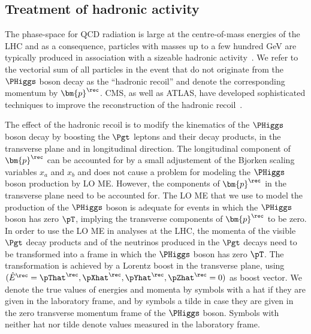 \subsection{Treatment of hadronic activity}
\label{sec:mem_hadRecoil}

The phase-space for QCD radiation is large at the centre-of-mass
energies of the LHC
and as a consequence, particles with masses up to a few hundred GeV 
are typically produced in association with a sizeable hadronic activity~\cite{Alwall:2010cq}.
We refer to the vectorial sum of all particles in the event that do not originate from the $\PHiggs$ boson decay
as the ``hadronic recoil'' and denote the corresponding momentum by $\bm{p}^{\rec}$.
CMS, as well as ATLAS, have developed sophisticated techniques to improve the reconstruction 
of the hadronic recoil~\cite{CMS-JME-13-003,ATLAS-CONF-2014-019}.

The effect of the hadronic recoil is to modify the kinematics of the $\PHiggs$ boson decay
by boosting the $\Pgt$ leptons and their decay products,
in the transverse plane and in longitudinal direction.
The longitudinal component of $\bm{p}^{\rec}$ can be accounted for by
a small adjustement of the Bjorken scaling variables $x_{a}$ and
$x_{b}$ and does not cause a problem for modeling the $\PHiggs$ boson
production by LO ME.
However, the components of $\bm{p}^{\rec}$ in the transverse plane need to be accounted for.
The LO ME that we use to model the production of the $\PHiggs$ boson 
is adequate for events in which the $\PHiggs$ boson has zero $\pT$,
implying the transverse components of $\bm{p}^{\rec}$ to be zero.
In order to use the LO ME in analyses at the LHC,
the momenta of the visible $\Pgt$ decay products and of the neutrinos produced in the $\Pgt$ decays
need to be transformed into a frame in which the $\PHiggs$ boson has zero $\pT$.
The transformation is achieved by a Lorentz boost in the transverse plane,
using $(\hat{E}^{\rec} = \pThat^{\rec}, \pXhat^{\rec}, \pYhat^{\rec}, \pZhat^{\rec} = 0)$ as boost
vector.
We denote the true values of energies and momenta by symbols with a
hat if they are given in the laboratory frame, and by symbols a tilde in case they are given in the zero transverse momentum frame of the $\PHiggs$ boson.
Symbols with neither hat nor tilde denote values measured in the
laboratory frame.

